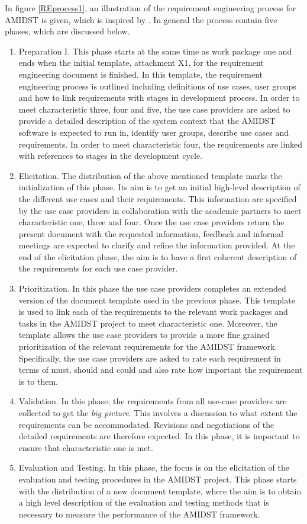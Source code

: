 In figure \ref{REprocess1}, an illustration of the requirement engineering process for AMIDST is given, which is inspired by \cite{Ebe10}.  In general the process contain five phases, which are discussed below.
\begin{enumerate}
\item Preparation I.  This phase starts at the same time as work package one and ends when the initial template, attachment X1, for the requirement engineering document is finished.  In this template, the requirement engineering process is outlined including definitions of use cases, user groups and how to link requirements with stages in development process.  In order to meet characteristic three, four and five, the use case providers are asked to provide a detailed description of the system context that the AMIDST software is expected to run in, identify user groups, describe use cases and requirements.  In order to meet characteristic four, the requirements are linked with references to stages in the development cycle. 
\item Elicitation. The distribution of the above mentioned template marks the initialization of this phase.  Its aim is to get an initial high-level description of the different use cases and their requirements. This information are specified by the use case providers in collaboration with the academic partners to meet characteristic one, three and four.  Once the use case providers return the present document with the requested information, feedback and informal meetings are expected to clarify and refine the information provided.  At the end of the elicitation phase, the aim is to have a first coherent description of the requirements for each use case provider.
 \item Prioritization. In this phase the use case providers completes an extended version of the document template used in the previous phase. This template is used to link each of the requirements to the relevant work packages and tasks in the AMIDST project to meet characteristic one. Moreover, the template allows the use case providers to provide a more fine grained prioritization of the relevant requirements for the AMIDST framework.  Specifically, the use case providers are asked to rate each requirement in terms of must, should and could and also rate how important the requirement is to them.  
\item Validation. In this phase, the requirements from all use-case providers are collected to get the \emph{big picture}.  This involves a discussion to what extent the requirements can be accommodated. Revisions and negotiations of the detailed requirements are therefore expected.  In this phase, it is important to ensure that characteristic one is met.
 \item Evaluation and Testing. In this phase, the focus is on the elicitation of the evaluation and testing procedures in the AMIDST project. This phase starts with the distribution of a new document template, where the aim is to obtain a high level description of the evaluation and testing methods that is necessary to measure the performance of the AMIDST framework.
\end{enumerate}

